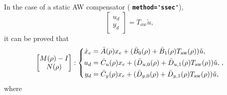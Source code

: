 \documentclass[fleqn,11pt]{article}
\newcommand{\lcode}[1]{\textbf{%
    \lstinline[style=mystyle]{#1}}}
\begin{document}
In the case of a static AW compensator (\lcode{method='ssec'}),
\begin{equation}\label{eq:stat-1}
    \begin{bmatrix} u_d \\ y_d \end{bmatrix} =
    T_{aw}\check{u},
\end{equation}
it can be proved \citep{Turner2004} that
\begin{equation}\label{eq:stat-2}
    \begin{bmatrix} M(\rho)-I \\ N(\rho) \end{bmatrix} :
    \left\{
        \begin{aligned}
            \dot x_e &= \bar A(\rho) x_e + (\bar{B}_0(\rho) + \bar{B}_1(\rho)T_{\mathrm{aw}}(\rho)) \check{u},\\
               u_d &= \bar C_{u}(\rho) x_e + (\bar{D}_{u,0}(\rho) + \bar D_{u,1}(\rho)T_{\mathrm{aw}}(\rho)) \check{u},\\
               y_d &= \bar C_{y}(\rho) x_e + (\bar{D}_{y,0}(\rho) + \bar D_{y,1}(\rho)T_{\mathrm{aw}}(\rho)) \check{u},\\
        \end{aligned}
    \right.,
\end{equation}
where
\end{document}
